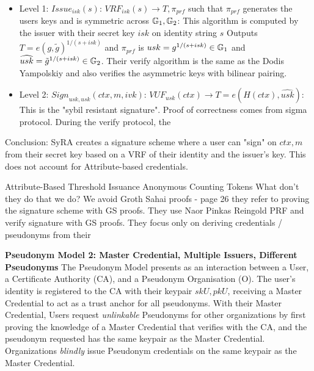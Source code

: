 \begin{itemize}
    \item Level 1: $Issue_{isk}(s)$: $VRF_{isk}(s) \to T, \pi_{prf}$ such that $\pi_{prf}$ generates the users keys and is symmetric across $\mathbb{G}_1, \mathbb{G}_2$: This algorithm is computed by the issuer with their secret key $isk$ on identity string $s$ Outputs $T = e(g, \tilde{g})^{1/(s + isk)}$ and $\pi_{prf}$ is $usk = g^{1/(s + isk)} \in \mathbb{G}_1$ and $\widehat{usk} = \tilde{g}^{1/(s + isk)} \in \mathbb{G}_2$. Their verify algorithm is the same as the Dodis Yampolskiy and also verifies the asymmetric keys with bilinear pairing.
    \item Level 2: $Sign_{usk, \widehat{usk}}(ctx, m, ivk)$: $VUF_{usk}(ctx) \to T = e(H(ctx), \widehat{usk})$: This is the "sybil resistant signature". Proof of correctness comes from sigma protocol. During the verify protocol, the 
\end{itemize}

Conclusion: SyRA creates a signature scheme where a user can "sign" on $ctx, m$ from their secret key based on a VRF of their identity and the issuer's key. This does not account for Attribute-based credentials.

Attribute-Based Threshold Issuance Anonymous Counting Tokens \cite{rabaninejad_attribute-based_nodate}
What don't they do that we do?
We avoid Groth Sahai proofs - page 26 they refer to proving the signature scheme with GS proofs. 
They use Naor Pinkas Reingold PRF and verify signature with GS proofs. 
They focus only on deriving credentials / pseudonyms from their

\noindent \textbf{Pseudonym Model 2: Master Credential, Multiple Issuers, Different Pseudonyms}
The Pseudonym Model \cite{goos_pseudonym_2000} presents as an interaction between a User, a Certificate Authority (CA), and a Pseudonym Organisation (O). The user's identity is registered to the CA with their keypair $skU, pkU$, receiving a Master Credential to act as a trust anchor for all pseudonyms. With their Master Credential, Users request \emph{unlinkable} Pseudonyms for other organizations by first proving the knowledge of a Master Credential that verifies with the CA, and the pseudonym requested has the same keypair as the Master Credential. Organizations \emph{blindly} issue Pseudonym credentials on the same keypair as the Master Credential.


